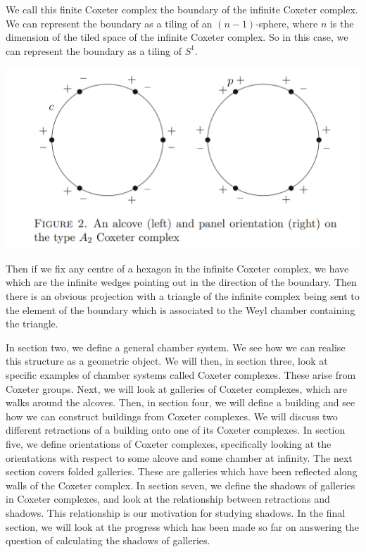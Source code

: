 \documentclass[11pt]{article}
\begin{document}
We call this finite Coxeter complex the boundary of the infinite Coxeter complex. We can represent the boundary as a tiling of an $(n-1)$-sphere, where $n$ is the dimension of the tiled space of the infinite Coxeter complex. So in this case, we can represent the boundary as a tiling of $S^1$.

\begin{center}
    \includegraphics[scale=0.6]{Screenshot 2023-02-03 102201.png}\\
\end{center}

Then if we fix any centre of a hexagon in the infinite Coxeter complex, we have  which are the infinite wedges pointing out in the direction of the boundary. Then there is an obvious projection with a triangle of the infinite complex being sent to the element of the boundary which is associated to the Weyl chamber containing the triangle.



In section two, we define a general chamber system. We see how we can realise this structure as a geometric object. We will then, in section three, look at specific examples of chamber systems called Coxeter complexes. These arise from Coxeter groups. Next, we will look at galleries of Coxeter complexes, which are walks around the alcoves. Then, in section four, we will define a building and see how we can construct buildings from Coxeter complexes. We will discuss two different retractions of a building onto one of its Coxeter complexes. In section five, we define orientations of Coxeter complexes, specifically looking at the orientations with respect to some alcove and some chamber at infinity. The next section covers folded galleries. These are galleries which have been reflected along walls of the Coxeter complex. In section seven, we define the shadows of galleries in Coxeter complexes, and look at the relationship between retractions and shadows. This relationship is our motivation for studying shadows. In the final section, we will look at the progress which has been made so far on answering the question of calculating the shadows of galleries. 
\end{document}
